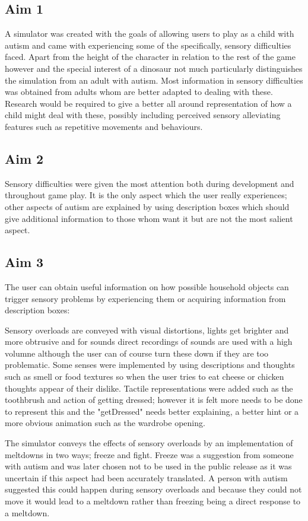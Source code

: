 \documentclass[11pt]{report}
\begin{document}
\subsection*{Aim 1}
A simulator was created with the goals of allowing users to play as a child with autism and came with experiencing some of the specifically, sensory difficulties faced. Apart from the height of the character in relation to the rest of the game however and the special interest of a dinosaur not much particularly distinguishes the simulation from an adult with autism. Most information in sensory difficulties was obtained from adults whom are better adapted to dealing with these. Research would be required to give a better all around representation of how a child might deal with these, possibly including perceived sensory alleviating features such as repetitive movements and behaviours.  

\subsection*{Aim 2}
Sensory difficulties were given the most attention both during development and throughout game play. It is the only aspect which the user really experiences; other aspects of autism are explained by using description boxes which should give additional information to those whom want it but are not the most salient aspect. 

\subsection*{Aim 3}
The user can obtain useful information on how possible household objects can trigger sensory problems by experiencing them or acquiring information from description boxes:

Sensory overloads are conveyed with visual distortions, lights get brighter and more obtrusive and for sounds direct recordings of sounds are used with a high volumne although the user can of course turn these down if they are too problematic. Some senses were implemented by using descriptions and thoughts such as smell or food textures so when the user tries to eat cheese or chicken thoughts appear of their dislike. Tactile representations were added such as the toothbrush and action of getting dressed; however it is felt more needs to be done to represent this and the "getDressed" needs better explaining, a better hint or a more obvious animation such as the wardrobe opening.

The simulator conveys the effects of sensory overloads by an implementation of meltdowns in two ways; freeze and fight. Freeze was a suggestion from someone with autism and was later chosen not to be used in the public release as it was uncertain if this aspect had been accurately translated. A person with autism suggested this could happen during sensory overloads and because they could not move it would lead to a meltdown rather than freezing being a direct response to a meltdown. 
\end{document}
